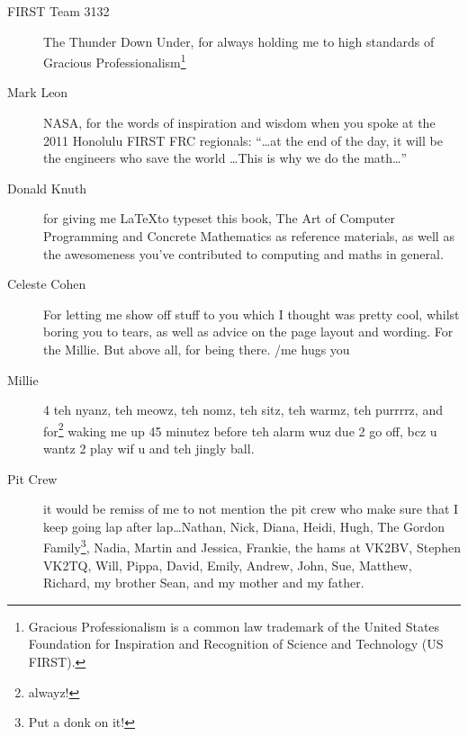 \begin{description}
  \item[FIRST Team 3132] The Thunder Down Under, for always holding me to high
  standards of Gracious Professionalism\texttrademark\footnote{Gracious
  Professionalism is a common law trademark of the United States Foundation for
  Inspiration and Recognition of Science and Technology (US FIRST).}
  
  \item[Mark Leon] NASA, for the words of inspiration and wisdom when you
  spoke at the 2011 Honolulu FIRST FRC regionals:
  ``\ldots at the end of the day, it will be the engineers who save the world
  \ldots This is why we do the math\ldots''
  
  \item[Donald Knuth] for giving me \LaTeX to typeset this book, The Art of
  Computer Programming and Concrete Mathematics as reference materials, as well
  as the awesomeness you've contributed to computing and maths in general.
  
  \item[Celeste Cohen] For letting me show off stuff to you which I thought
  was pretty cool, whilst boring you to tears, as well as advice on the page
  layout and wording. For the Millie. But above all, for being there. /me hugs
  you
  
  \item[Millie] 4 teh nyanz, teh meowz, teh nomz, teh sitz, teh warmz, teh
  purrrrz, and for\footnote{alwayz!} waking me up 45 minutez before teh
  alarm wuz due 2 go off, bcz u wantz 2 play wif u and teh jingly ball.
  
  \item[Pit Crew] it would be remiss of me to not mention the pit crew who make
  sure that I keep going lap after lap\ldots Nathan, Nick, Diana, Heidi, Hugh,
  The Gordon Family\footnote{Put a donk on it!}, Nadia, Martin and Jessica,
  Frankie, the hams at VK2BV, Stephen VK2TQ, Will, Pippa, David, Emily, Andrew,
  John, Sue, Matthew, Richard, my brother Sean, and my mother and my father.
\end{description}